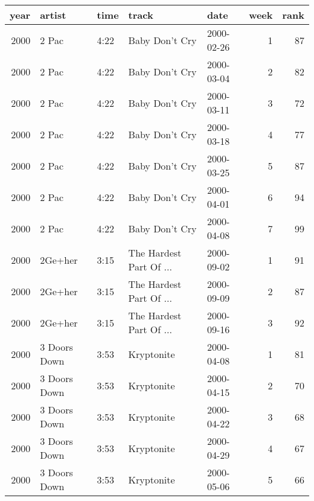 \begin{tabular}{rllllrr}
  \toprule
 year & artist & time & track & date & week & rank \\ 
  \midrule
  2000 & 2 Pac & 4:22 & Baby Don't Cry & 2000-02-26 &   1 &  87 \\ 
  2000 & 2 Pac & 4:22 & Baby Don't Cry & 2000-03-04 &   2 &  82 \\ 
  2000 & 2 Pac & 4:22 & Baby Don't Cry & 2000-03-11 &   3 &  72 \\ 
  2000 & 2 Pac & 4:22 & Baby Don't Cry & 2000-03-18 &   4 &  77 \\ 
  2000 & 2 Pac & 4:22 & Baby Don't Cry & 2000-03-25 &   5 &  87 \\ 
  2000 & 2 Pac & 4:22 & Baby Don't Cry & 2000-04-01 &   6 &  94 \\ 
  2000 & 2 Pac & 4:22 & Baby Don't Cry & 2000-04-08 &   7 &  99 \\ 
  2000 & 2Ge+her & 3:15 & The Hardest Part Of ... & 2000-09-02 &   1 &  91 \\ 
  2000 & 2Ge+her & 3:15 & The Hardest Part Of ... & 2000-09-09 &   2 &  87 \\ 
  2000 & 2Ge+her & 3:15 & The Hardest Part Of ... & 2000-09-16 &   3 &  92 \\ 
  2000 & 3 Doors Down & 3:53 & Kryptonite & 2000-04-08 &   1 &  81 \\ 
  2000 & 3 Doors Down & 3:53 & Kryptonite & 2000-04-15 &   2 &  70 \\ 
  2000 & 3 Doors Down & 3:53 & Kryptonite & 2000-04-22 &   3 &  68 \\ 
  2000 & 3 Doors Down & 3:53 & Kryptonite & 2000-04-29 &   4 &  67 \\ 
  2000 & 3 Doors Down & 3:53 & Kryptonite & 2000-05-06 &   5 &  66 \\ 
   \bottomrule
\end{tabular}
